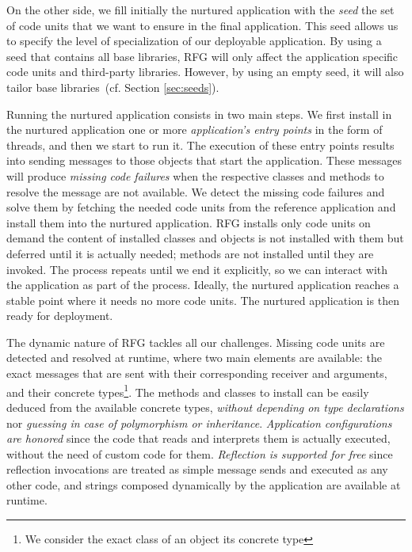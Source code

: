 On the other side, we fill initially the nurtured application with the \emph{seed} \ie the set of code units that we want to ensure in the final application. This seed allows us to specify the level of specialization of our deployable application.
By using a seed that contains all base libraries, RFG will only affect the application specific code units and third-party libraries.
However, by using an empty seed, it will also tailor base libraries~(cf. Section \ref{sec:seeds}).

Running the nurtured application consists in two main steps. We first install in the nurtured application one or more \emph{application's entry points} in the form of threads, and then we start to run it.
The execution of these entry points results into sending messages to those objects that start the application. These messages will produce \emph{missing code failures} when the respective classes and methods to resolve the message are not available.
We detect the missing code failures and solve them by fetching the needed code units from the reference application and install them into the nurtured application. RFG installs only code units on demand \ie the content of installed classes and objects is not installed with them but deferred until it is actually needed; methods are not installed until they are invoked.
The process repeats until we end it explicitly, so we can interact with the application as part of the process. Ideally, the nurtured application reaches a stable point where it needs no more code units.
The nurtured application is then ready for deployment.

The dynamic nature of RFG tackles all our challenges. Missing code units are detected and resolved at runtime, where two main elements are available: the exact messages that are sent with their corresponding receiver and arguments, and their concrete types\footnote{We consider the exact class of an object its concrete type}. The methods and classes to install can be easily deduced from the available concrete types, \emph{without depending on type declarations} nor \emph{guessing in case of polymorphism or inheritance}. \emph{Application configurations are honored} since the code that reads and interprets them is actually executed, without the need of custom code for them. \emph{Reflection is supported for free} since reflection invocations are treated as simple message sends and executed as any other code, and strings composed dynamically by the application are available at runtime. 




